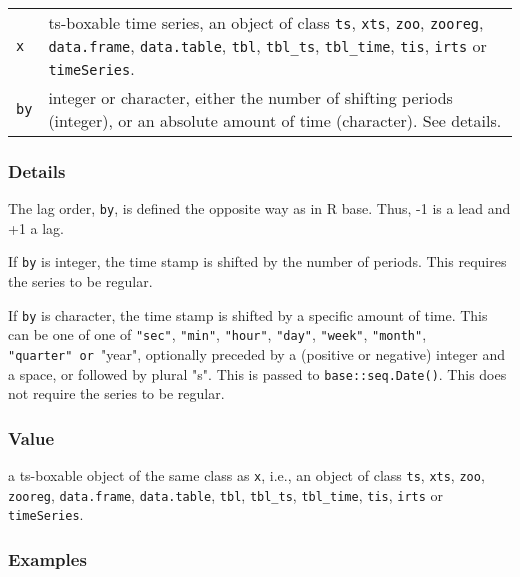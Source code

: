 \documentclass[
  letterpaper,
  DIV=11,
  numbers=noendperiod]{scrreport}
\begin{document}
\begin{longtable}[]{@{}ll@{}}
\toprule\noalign{}
\endhead
\bottomrule\noalign{}
\endlastfoot
\texttt{x} & ts-boxable time series, an object of class \texttt{ts},
\texttt{xts}, \texttt{zoo}, \texttt{zooreg}, \texttt{data.frame},
\texttt{data.table}, \texttt{tbl}, \texttt{tbl\_ts}, \texttt{tbl\_time},
\texttt{tis}, \texttt{irts} or \texttt{timeSeries}. \\
\texttt{by} & integer or character, either the number of shifting
periods (integer), or an absolute amount of time (character). See
details. \\
\end{longtable}

\subsubsection{Details}\label{details-11}

The lag order, \texttt{by}, is defined the opposite way as in R base.
Thus, -1 is a lead and +1 a lag.

If \texttt{by} is integer, the time stamp is shifted by the number of
periods. This requires the series to be regular.

If \texttt{by} is character, the time stamp is shifted by a specific
amount of time. This can be one of one of \texttt{"sec"},
\texttt{"min"}, \texttt{"hour"}, \texttt{"day"}, \texttt{"week"},
\texttt{"month"}, \texttt{⁠"quarter"\ or\ ⁠}"year", optionally preceded by
a (positive or negative) integer and a space, or followed by plural "s".
This is passed to \texttt{base::seq.Date()}. This does not require the
series to be regular.

\subsubsection{Value}\label{value-30}

a ts-boxable object of the same class as \texttt{x}, i.e., an object of
class \texttt{ts}, \texttt{xts}, \texttt{zoo}, \texttt{zooreg},
\texttt{data.frame}, \texttt{data.table}, \texttt{tbl},
\texttt{tbl\_ts}, \texttt{tbl\_time}, \texttt{tis}, \texttt{irts} or
\texttt{timeSeries}.

\subsubsection{Examples}\label{examples-30}
\end{document}
